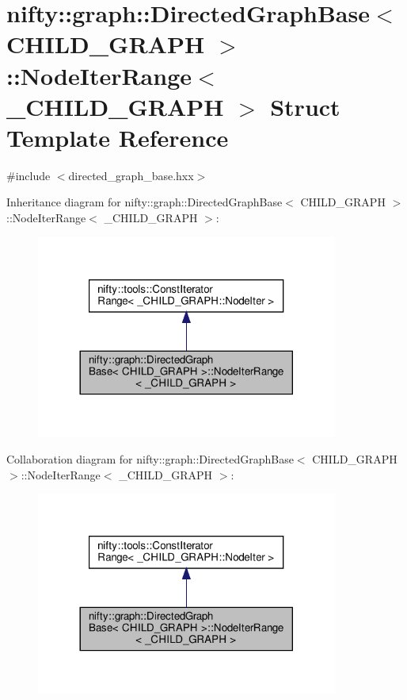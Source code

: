 \hypertarget{structnifty_1_1graph_1_1DirectedGraphBase_1_1NodeIterRange}{}\section{nifty\+:\+:graph\+:\+:Directed\+Graph\+Base$<$ C\+H\+I\+L\+D\+\_\+\+G\+R\+A\+PH $>$\+:\+:Node\+Iter\+Range$<$ \+\_\+\+C\+H\+I\+L\+D\+\_\+\+G\+R\+A\+PH $>$ Struct Template Reference}
\label{structnifty_1_1graph_1_1DirectedGraphBase_1_1NodeIterRange}


{\ttfamily \#include $<$directed\+\_\+graph\+\_\+base.\+hxx$>$}



Inheritance diagram for nifty\+:\+:graph\+:\+:Directed\+Graph\+Base$<$ C\+H\+I\+L\+D\+\_\+\+G\+R\+A\+PH $>$\+:\+:Node\+Iter\+Range$<$ \+\_\+\+C\+H\+I\+L\+D\+\_\+\+G\+R\+A\+PH $>$\+:
\nopagebreak
\begin{figure}[H]
\begin{center}
\leavevmode
\includegraphics[width=281pt]{structnifty_1_1graph_1_1DirectedGraphBase_1_1NodeIterRange__inherit__graph}
\end{center}
\end{figure}


Collaboration diagram for nifty\+:\+:graph\+:\+:Directed\+Graph\+Base$<$ C\+H\+I\+L\+D\+\_\+\+G\+R\+A\+PH $>$\+:\+:Node\+Iter\+Range$<$ \+\_\+\+C\+H\+I\+L\+D\+\_\+\+G\+R\+A\+PH $>$\+:
\nopagebreak
\begin{figure}[H]
\begin{center}
\leavevmode
\includegraphics[width=281pt]{structnifty_1_1graph_1_1DirectedGraphBase_1_1NodeIterRange__coll__graph}
\end{center}
\end{figure}
